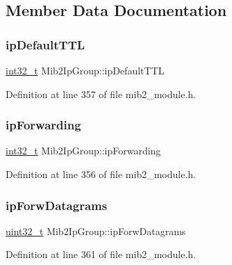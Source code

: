 \subsection{Member Data Documentation}
\mbox{\label{structMib2IpGroup_a3c4796d6fbe05b13db61909730b459af}} 
\subsubsection{\texorpdfstring{ip\+Default\+T\+TL}{ipDefaultTTL}}
{\footnotesize\ttfamily \hyperlink{stdint_8h_ab1967d8591af1a4e48c37fd2b0f184d0}{int32\+\_\+t} Mib2\+Ip\+Group\+::ip\+Default\+T\+TL}



Definition at line 357 of file mib2\+\_\+module.\+h.

\mbox{\label{structMib2IpGroup_a91e59ed02859f710b194000b28c1ac5a}} 
\subsubsection{\texorpdfstring{ip\+Forwarding}{ipForwarding}}
{\footnotesize\ttfamily \hyperlink{stdint_8h_ab1967d8591af1a4e48c37fd2b0f184d0}{int32\+\_\+t} Mib2\+Ip\+Group\+::ip\+Forwarding}



Definition at line 356 of file mib2\+\_\+module.\+h.

\mbox{\label{structMib2IpGroup_a73ac7171cf35d4c41223b97d585c73e6}} 
\subsubsection{\texorpdfstring{ip\+Forw\+Datagrams}{ipForwDatagrams}}
{\footnotesize\ttfamily \hyperlink{stdint_8h_a435d1572bf3f880d55459d9805097f62}{uint32\+\_\+t} Mib2\+Ip\+Group\+::ip\+Forw\+Datagrams}



Definition at line 361 of file mib2\+\_\+module.\+h.

